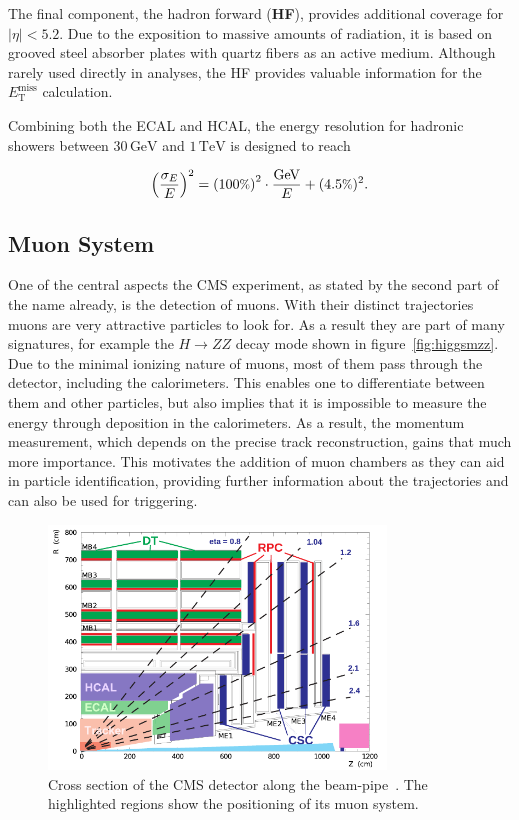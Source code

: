 The final component, the hadron forward (\textbf{HF}), provides additional coverage for $|\eta| < 5.2$. Due to the exposition to massive amounts of radiation, it is based on grooved steel absorber plates with quartz fibers as an active medium. Although rarely used directly in analyses, the HF provides valuable information for the $E^{\text{miss}}_{\text{T}}$ calculation.

Combining both the ECAL and HCAL, the energy resolution for hadronic showers between $30\,\text{GeV}$ and $1\,\text{TeV}$ is designed to reach~\cite{hcalreso}

\begin{equation}
  \label{eq:hcalreso}
  \left( \frac{\sigma_E}{E} \right)^2 = \left( 100\pct \right)^2 \cdot \frac{\text{GeV}}{E} + (4.5\pct)^2.
\end{equation}


\subsection{Muon System}
\label{sec:muon-system}

One of the central aspects the CMS experiment, as stated by the second part of the name already, is the detection of muons. With their distinct trajectories muons are very attractive particles to look for. As a result they are part of many signatures, for example the $H \rightarrow ZZ$ decay mode shown in figure~\ref{fig:higgsmzz}. Due to the minimal ionizing nature of muons, most of them pass through the detector, including the calorimeters. This enables one to differentiate between them and other particles, but also implies that it is impossible to measure the energy through deposition in the calorimeters. As a result, the momentum measurement, which depends on the precise track reconstruction, gains that much more importance. This motivates the addition of muon chambers as they can aid in particle identification, providing further information about the trajectories and can also be used for triggering.

\begin{figure}[!htb]
  \centering
  \includegraphics[width=0.8\textwidth]{plots/muonsys.pdf}
  \caption{Cross section of the CMS detector along the beam-pipe~\cite{muonid2}. The highlighted regions show the positioning of its muon system.}
  \label{fig:muonsys}
\end{figure}

